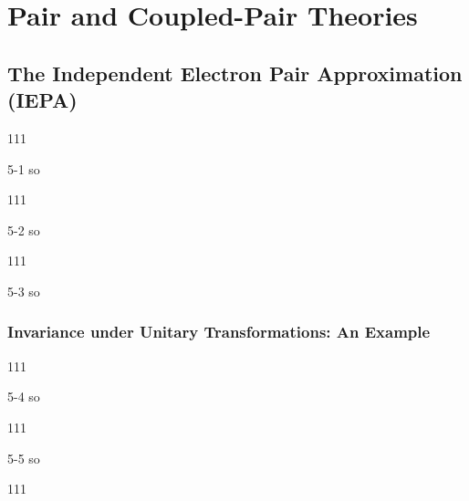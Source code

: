 \documentclass[a4paper]{book}
\begin{document}

	\chapter{Pair and Coupled-Pair Theories}
	
	\section{The Independent Electron Pair Approximation (IEPA)}
	
	\begin{exercise}
	111
	\end{exercise}
	
	\begin{solution}
		5-1 so
	\end{solution}
	
	\begin{exercise}
	111
	\end{exercise}
	
	\begin{solution}
		5-2 so
	\end{solution}
	
	\begin{exercise}
	111
	\end{exercise}
	
	\begin{solution}
		5-3 so
	\end{solution}
	
	\subsection{Invariance under Unitary Transformations: An Example}
	
	\begin{exercise}
	111
	\end{exercise}
	
	\begin{solution}
		5-4 so
	\end{solution}
	
	\begin{exercise}
	111
	\end{exercise}
	
	\begin{solution}
		5-5 so
	\end{solution}
	
	\begin{exercise}
	111
	\end{exercise}
	
\end{document}
